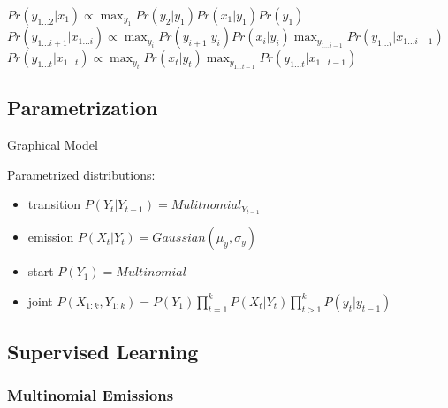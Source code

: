 \documentclass[]{article}
\theoremstyle{definition}
\begin{document}
\begin{algorithmic}
    \State $Pr(y_{1 \ldots 2} | x_1) \propto \max_{y_1} Pr(y_2 | y_1) Pr(x_1 | y_1) Pr(y_1) $
    \State $Pr(y_{1 \ldots i+1} | x_{1 \ldots i}) \propto \max_{y_i} Pr(y_{i+1} | y_i) Pr(x_i | y_i) \max_{y_{1 \ldots i-1}} Pr(y_{1 \ldots i} | x_{1 \ldots i-1}) $
    \EndFor
    \State $Pr(y_{1 \ldots t} | x_{1 \ldots t}) \propto \max_{y_t} Pr(x_t | y_t) \max_{y_{1 \ldots t-1}} Pr(y_{1 \ldots t} | x_{1 \ldots t-1}) $
\end{algorithmic}

\subsection{Parametrization}
\label{sub:parametrization}
Graphical Model \\

Parametrized distributions:
\begin{itemize}
    \item transition $P(Y_t|Y_{t-1}) = Mulitnomial_{Y_{t-1}}$
    \item emission $P(X_t | Y_t) = Gaussian(\mu_y, \sigma_y)$
    \item start $P(Y_1) = Multinomial$ 
    \item joint $P(X_{1:k}, Y_{1:k}) = P(Y_1) \prod_{t=1}^{k} P(X_t | Y_t) \prod_{t > 1}^k P(y_t | y_{t-1})$
\end{itemize}

\subsection{Supervised Learning}
\label{sub:supervised_learning}

\subsubsection{Multinomial Emissions}
\label{ssub:Multinomial Emissions}
\end{document}
